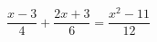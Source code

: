 \begin{ex}[type=equation]
	\begin{condition}
		\( \dfrac{x-3}{4}+\dfrac{2x+3}{6}=\dfrac{x^2-11}{12} \)
	\end{condition}
\end{ex}